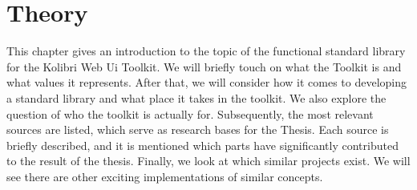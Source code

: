 \chapter{Theory}
This chapter gives an introduction to the topic of the functional standard
library for the Kolibri Web Ui Toolkit. We will briefly touch on what the 
Toolkit is and what values it represents. After that, we will consider how it
comes to developing a standard library and what place it takes in the
toolkit. We also explore the question of who the toolkit is actually for.
\newline
Subsequently, the most relevant sources are listed, which serve as research bases for the Thesis.
Each source is briefly described, and it is mentioned which parts have significantly 
contributed to the result of the thesis.
\newline
Finally, we look at which similar projects exist. We will see there are other
exciting implementations of similar concepts.



